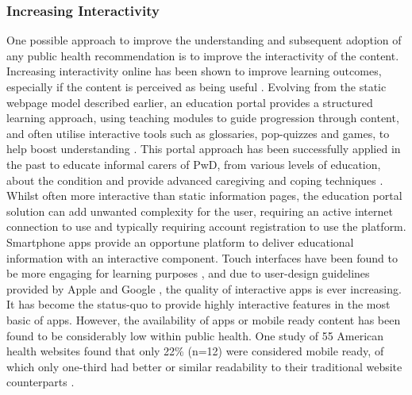 \subsubsection{Increasing Interactivity}
One possible approach to improve the understanding and subsequent adoption of any public health recommendation is to improve the interactivity of the content. Increasing interactivity online has been shown to improve learning outcomes, especially if the content is perceived as being useful \cite{Oh2015, Wei2015}. Evolving from the static webpage model described earlier, an education portal provides a structured learning approach, using teaching modules to guide progression through content, and often utilise interactive tools such as glossaries, pop-quizzes and games, to help boost understanding \cite{Hattink2015}. This portal approach has been successfully applied in the past to educate informal carers of PwD, from various levels of education, about the condition and provide advanced caregiving and coping techniques \cite{Hattink2015}.
Whilst often more interactive than static information pages, the education portal solution can add unwanted complexity for the user, requiring an active internet connection to use and typically requiring account registration to use the platform.
Smartphone apps provide an opportune platform to deliver educational information with an interactive component. Touch interfaces have been found to be more engaging for learning purposes \cite{Jones2006}, and due to user-design guidelines provided by Apple and Google \cite{AppleNotifications2015,GoogleAndroid2015}, the quality of interactive apps is ever increasing. It has become the status-quo to provide highly interactive features in the most basic of apps. However, the availability of apps or mobile ready content has been found to be considerably low within public health. One study of 55 American health websites found that only 22\% (n=12) were considered mobile ready, of which only one-third had better or similar readability to their traditional website counterparts \cite{Cunningham2015}.

